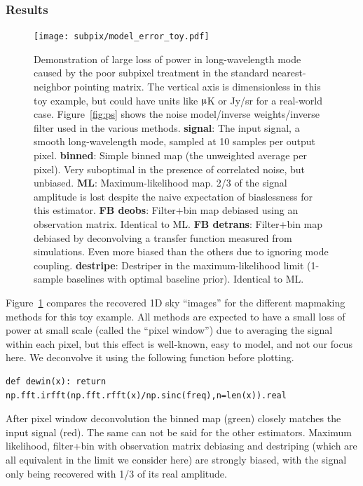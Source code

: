 \documentclass{aa}
\newcommand{\dfn}[1]{\textbf{#1}}
\begin{document}
\subsubsection{Results}
\begin{figure}
	\centering
	\hspace*{-5mm}\texttt{[image: subpix/model\_error\_toy.pdf]}
	\caption{
		Demonstration of large loss of power in long-wavelength mode
		caused by the poor subpixel treatment in the standard nearest-neighbor pointing matrix.
		The vertical axis is dimensionless in this toy example, but
		could have units like $\micro$K or Jy/sr for a real-world case.
		Figure~\ref{fig:ps} shows the noise model/inverse weights/inverse filter
		used in the various methods.
		\dfn{signal}: The input signal, a smooth long-wavelength mode,
		sampled at 10 samples per output pixel.
		\dfn{binned}: Simple binned map (the unweighted average per pixel).
		Very suboptimal in the presence of correlated noise, but unbiased.
		\dfn{ML}: Maximum-likelihood map. 2/3 of the signal amplitude is lost despite
		the naive expectation of biaslessness for this estimator.
		\dfn{FB deobs}: Filter+bin map debiased using an observation matrix.
		Identical to ML.
		\dfn{FB detrans}: Filter+bin map debiased by deconvolving a
		transfer function measured from simulations. Even more biased
		than the others due to ignoring mode coupling.
		\dfn{destripe}: Destriper in the maximum-likelihood limit
		(1-sample baselines with optimal baseline prior). Identical to ML.
	}
	\label{fig:subpix-bias}
\end{figure}

Figure~\ref{fig:subpix-bias} compares the recovered 1D sky ``images''
for the different mapmaking methods for this toy example. All methods
are expected to have a small loss of power at small scale (called
the ``pixel window'') due to averaging the signal within each pixel,
but this effect is well-known, easy to model, and not our focus here.
We deconvolve it using the following function before plotting.
\begin{lstlisting}
def dewin(x): return np.fft.irfft(np.fft.rfft(x)/np.sinc(freq),n=len(x)).real
\end{lstlisting}
After pixel window deconvolution the binned map (green) closely matches the
input signal (red). The same can not be said for the other estimators.
Maximum likelihood, filter+bin with observation matrix debiasing and destriping
(which are all equivalent in the limit we consider here) are strongly biased,
with the signal only being recovered with 1/3 of its real amplitude.
\end{document}
